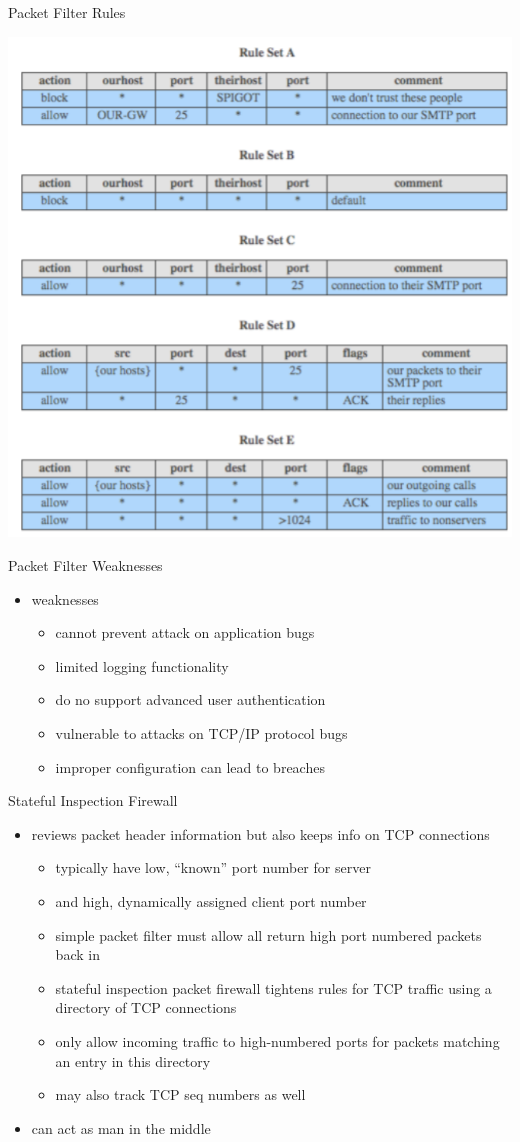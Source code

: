 \documentclass{beamer}
\begin{document}
\begin{frame}{Packet Filter Rules}
  \begin{center}
    \includegraphics[width=0.6\linewidth]{filter-rules}
  \end{center}
\end{frame}

\begin{frame}{Packet Filter Weaknesses}
  \begin{itemize}
  \item weaknesses 
    \begin{itemize}
    \item cannot prevent attack on application bugs 
    \item limited logging functionality 
    \item do no support advanced user authentication 
    \item vulnerable to attacks on TCP/IP protocol bugs 
    \item improper configuration can lead to breaches
    \end{itemize}
  \end{itemize}
\end{frame}

\begin{frame}{Stateful Inspection Firewall}
  \begin{itemize}
  \item reviews packet header information but also keeps 
    info on TCP connections 
    \begin{itemize}
    \item typically have low, ``known'' port number for server 
    \item and high, dynamically assigned client port number
    \item simple packet filter must allow all return high port 
      numbered packets back in 
    \item stateful inspection packet firewall tightens rules for TCP 
      traffic using a directory of TCP connections 
    \item only allow incoming traffic to high-numbered ports for 
      packets matching an entry in this directory 
    \item may also track TCP seq numbers as well
    \end{itemize}
  \item can act as man in the middle
  \end{itemize}
\end{frame}
\end{document}
